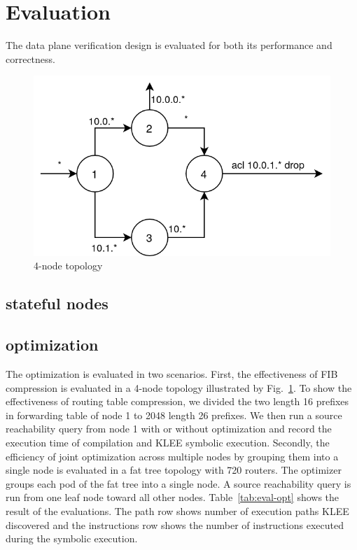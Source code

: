 \documentclass[letterpaper, 10 pt, conference]{ieeeconf}  %
\begin{document}
\section{Evaluation}\label{sec:eval}
The data plane verification design is evaluated for both its performance and correctness.

\begin{figure}[]
	\centering
	\includegraphics[width=\linewidth]{scenario-simple.png}
	\caption{4-node topology}
	\label{fig:scenario1}
\end{figure}

\subsection{stateful nodes}

\subsection{optimization}
The optimization is evaluated in two scenarios. First, the effectiveness of FIB compression is evaluated in a 4-node topology illustrated by Fig.~\ref{fig:scenario1}. To show the effectiveness of routing table compression, we divided the two length 16 prefixes in forwarding table of node 1 to 2048 length 26 prefixes. We then run a source reachability query from node 1 with or without optimization and record the execution time of compilation and KLEE symbolic execution. Secondly, the efficiency of joint optimization across multiple nodes by grouping them into a single node is evaluated in a fat tree topology with 720 routers. The optimizer groups each pod of the fat tree into a single node. A source reachability query is run from one leaf node toward all other nodes. Table~\ref{tab:eval-opt} shows the result of the evaluations. The path row shows number of execution paths KLEE discovered and the instructions row shows the number of instructions executed during the symbolic execution.
\end{document}
